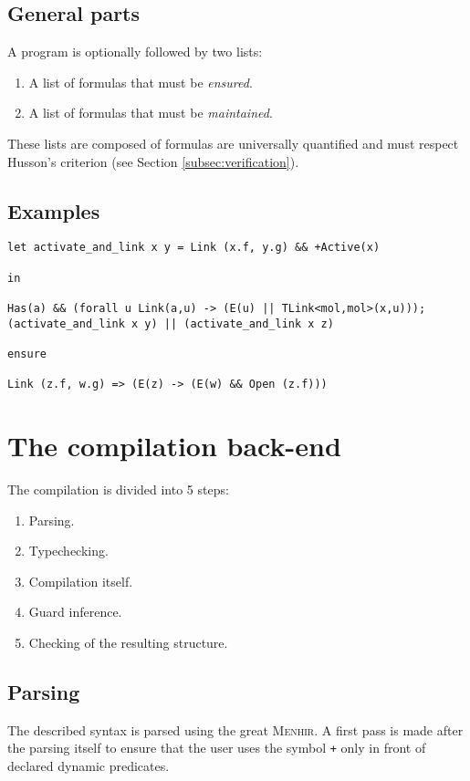 \documentclass[10pt,a4paper]{article}
\newcommand\Menhir{\textsc{Menhir}}
\newcommand{\ocaml}{\texttt}
\begin{document}
\subsection{General parts}
A program is optionally followed by two lists:
\begin{enumerate}
\item A list of formulas that must be \emph{ensured}.
\item A list of formulas that must be \emph{maintained}.
\end{enumerate}

These lists are composed of formulas are universally quantified and must respect Husson's criterion (see Section \ref{subsec:verification}).

\subsection{Examples}
\label{configex}
\begin{verbatim}
let activate_and_link x y = Link (x.f, y.g) && +Active(x)

in

Has(a) && (forall u Link(a,u) -> (E(u) || TLink<mol,mol>(x,u)));
(activate_and_link x y) || (activate_and_link x z)

ensure

Link (z.f, w.g) => (E(z) -> (E(w) && Open (z.f)))
\end{verbatim}


\section{The compilation back-end}
The compilation is divided into 5 steps:
\begin{enumerate}
\item Parsing.
\item Typechecking.
\item Compilation itself.
\item Guard inference.
\item Checking of the resulting structure.
\end{enumerate}

\subsection{Parsing}
The described syntax is parsed using the great \Menhir{}\cite{menhir}. A first pass is made after the parsing itself to ensure that the user uses the symbol \ocaml{+} only in front of declared dynamic predicates.
\end{document}
